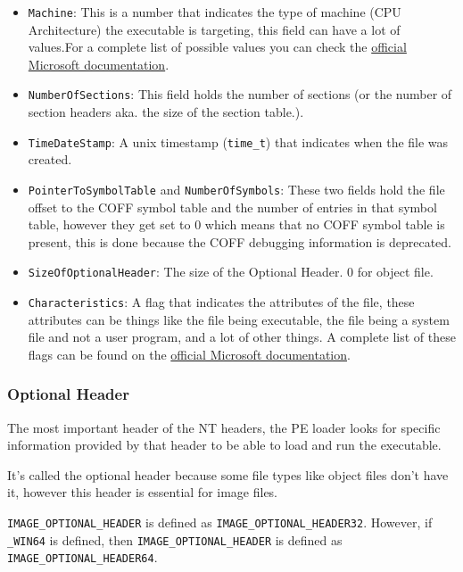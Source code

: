 \begin{itemize}
    \item \verb+Machine+: This is a number that indicates the type of machine (CPU Architecture) the executable is targeting, this field can have a lot of values.For a complete list of possible values you can check the \href{https://learn.microsoft.com/en-us/windows/win32/debug/pe-format#machine-types}{official Microsoft documentation}.
    \item \verb+NumberOfSections+: This field holds the number of sections (or the number of section headers aka. the size of the section table.).
    \item \verb+TimeDateStamp+: A unix timestamp (\verb+time_t+) that indicates when the file was created.
    \item \verb+PointerToSymbolTable+ and \verb+NumberOfSymbols+: These two fields hold the file offset to the COFF symbol table and the number of entries in that symbol table, however they get set to 0 which means that no COFF symbol table is present, this is done because the COFF debugging information is deprecated.
    \item \verb+SizeOfOptionalHeader+: The size of the Optional Header. 0 for object file.
    \item \verb+Characteristics+: A flag that indicates the attributes of the file, these attributes can be things like the file being executable, the file being a system file and not a user program, and a lot of other things. A complete list of these flags can be found on the \href{https://learn.microsoft.com/en-us/windows/win32/debug/pe-format#characteristics}{official Microsoft documentation}.
\end{itemize}


\subsubsection{Optional Header}
The most important header of the NT headers, the PE loader looks for specific information provided by that header to be able to load and run the executable.

It’s called the optional header because some file types like object files don’t have it, however this header is essential for image files. 

\verb+IMAGE_OPTIONAL_HEADER+ is defined as \verb+IMAGE_OPTIONAL_HEADER32+. However, if \verb+_WIN64+ is defined, then \verb+IMAGE_OPTIONAL_HEADER+ is defined as \verb+IMAGE_OPTIONAL_HEADER64+.

